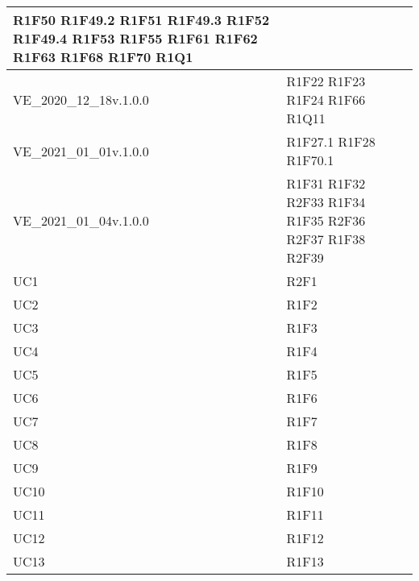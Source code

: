 \begin{center}
\begin{longtable}{|p{44mm}|p{22mm}|}
R1F50 \newline
R1F49.2 \newline
R1F51 \newline
R1F49.3 \newline
R1F52 \newline
R1F49.4 \newline
R1F53 \newline
R1F55 \newline
R1F61 \newline
R1F62 \newline
R1F63 \newline
R1F68 \newline
R1F70 \newline
R1Q1 
\\
\hline
VE\_2020\_12\_18v.1.0.0 &
R1F22 \newline
R1F23 \newline
R1F24 \newline
R1F66 \newline
R1Q11 
\\
\hline
VE\_2021\_01\_01v.1.0.0 &
R1F27.1 \newline
R1F28 \newline
R1F70.1 
\\
\hline
VE\_2021\_01\_04v.1.0.0 &
R1F31 \newline
R1F32 \newline
R2F33 \newline
R1F34 \newline
R1F35 \newline
R2F36 \newline
R2F37 \newline
R1F38 \newline
R2F39 
\\
\hline
UC1 &
R2F1 
\\
\hline
UC2 &
R1F2 
\\
\hline
UC3 &
R1F3 
\\
\hline
UC4 &
R1F4 
\\
\hline
UC5 &
R1F5 
\\
\hline
UC6 &
R1F6 
\\
\hline
UC7 &
R1F7 
\\
\hline
UC8 &
R1F8 
\\
\hline
UC9 &
R1F9 
\\
\hline
UC10 &
R1F10 
\\
\hline
UC11 &
R1F11 
\\
\hline
UC12 &
R1F12 
\\
\hline
UC13 &
R1F13 
\\

\end{longtable}
\end{center}
